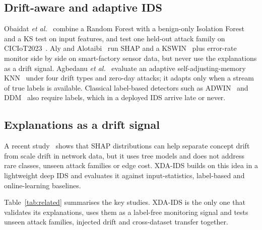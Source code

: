 \documentclass[pdflatex,sn-mathphys-num]{sn-jnl}%
\begin{document}
\subsection{Drift-aware and adaptive IDS}
Obaidat \textit{et al.}~\cite{obaidat2026} combine a Random Forest with a benign-only Isolation Forest~\cite{liu2008} and a KS test on input features, and test one held-out attack family on CICIoT2023~\cite{neto2023}. Aly and Alotaibi~\cite{aly2025} run SHAP and a KSWIN~\cite{raab2020} plus error-rate monitor side by side on smart-factory sensor data, but never use the explanations as a drift signal. Agbedanu \textit{et al.}~\cite{agbedanu2025} evaluate an adaptive self-adjusting-memory KNN~\cite{losing2016} under four drift types and zero-day attacks; it adapts only when a stream of true labels is available. Classical label-based detectors such as ADWIN~\cite{bifet2007} and DDM~\cite{gama2004} also require labels, which in a deployed IDS arrive late or never.

\subsection{Explanations as a drift signal}
A recent study~\cite{shapdrift} shows that SHAP distributions can help separate concept drift from scale drift in network data, but it uses tree models and does not address rare classes, unseen attack families or edge cost. XDA-IDS builds on this idea in a lightweight deep IDS and evaluates it against input-statistics, label-based and online-learning baselines.

Table~\ref{tab:related} summarises the key studies. XDA-IDS is the only one that validates its explanations, uses them as a label-free monitoring signal and tests unseen attack families, injected drift and cross-dataset transfer together.
\end{document}
